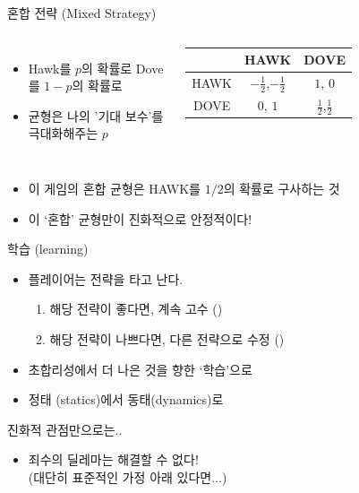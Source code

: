 \documentclass[final]{beamer}
\begin{document}
\begin{frame}[t]{혼합 전략 (Mixed Strategy)}
	\begin{columns}[c]
		\column{16em}
		\begin{itemize}
			\item Hawk를 $p$의 확률로 Dove를 $1-p$의 확률로 
			\item 균형은 나의 '기대 보수'를 극대화해주는 $p$
		\end{itemize}
		\column{14em}
		\setlength{\tabcolsep}{0.9em}
		\begin{tabular}{|c|c|c|} \hline
			& {HAWK} &  {DOVE}\\ \hline
			{HAWK} & {\large $-\frac{1}{2}$},{\large $-\frac{1}{2}$} & {$1$}, {$0$} \\ \hline%
			 {DOVE} & $0$, $1$  &  {\large $\frac{1}{2}$},{\large $\frac{1}{2}$}  \\ 
			\hline
		\end{tabular}
	\end{columns}
	\begin{itemize}
		\item 이 게임의 혼합 균형은 HAWK를 $1/2$의 확률로 구사하는 것
		\item 이 `혼합' 균형만이 진화적으로 안정적이다! 
	\end{itemize}
\end{frame}

\begin{frame}[t]{학습 (learning)}
	\begin{itemize}
		\item 플레이어는 전략을 타고 난다.\\[1em]
		\begin{enumerate} 
			\item 해당 전략이 좋다면, 계속 고수 ({\color{gray}{혹은 더 많은 자손}}) 
			\item 해당 전략이 나쁘다면, 다른 전략으로 수정 ({\color{gray}{혹은 더 적은 자손}})
		\end{enumerate}
			\item 초합리성에서 더 나은 것을 향한 `학습'으로 
			\item 정태 (statics)에서 동태(dynamics)로
	\end{itemize}
\end{frame}

\begin{frame}[t]{진화적 관점만으로는..}
	\begin{itemize}
		\item 죄수의 딜레마는 해결할 수 없다! \\(대단히 표준적인 가정 아래 있다면...)
	\end{itemize}
	\begin{center}
	\end{center}
\end{frame}
\end{document}
